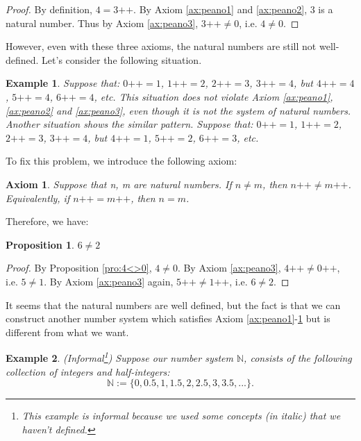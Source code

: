 \documentclass[a4paper]{book}
\newtheorem*{proof}{\textit{Proof.}}
\theoremstyle{break}
\newtheorem{axiom}{Axiom}[chapter]
\newtheorem{example}{Example}[section]
\newtheorem{proposition}{Proposition}[section]
\begin{document}
			\begin{proof}
				By definition, $4=3\texttt{++}$. By Axiom \ref{ax:peano1} and \ref{ax:peano2}, 3 is a natural number. Thus by Axiom \ref{ax:peano3}, $3\texttt{++} \neq 0$, i.e. $4 \neq 0$.
			\end{proof}
			However, even with these three axioms, the natural numbers are still not well-defined. Let's consider the following situation.
			\begin{example}
				Suppose that: $0\texttt{++}=1$, $1\texttt{++}=2$, $2\texttt{++}=3$, $3\texttt{++}=4$, but $4\texttt{++}=4$, $5\texttt{++}=4$, $6\texttt{++}=4$, etc. This situation does not violate Axiom \ref{ax:peano1}, \ref{ax:peano2} and \ref{ax:peano3}, even though it is not the system of natural numbers.\\
				Another situation shows the similar pattern. Suppose that: $0\texttt{++}=1$, $1\texttt{++}=2$, $2\texttt{++}=3$, $3\texttt{++}=4$, but $4\texttt{++}=1$, $5\texttt{++}=2$, $6\texttt{++}=3$, etc.
			\end{example}
			To fix this problem, we introduce the following axiom:
			\begin{axiom}
				\label{ax:peano4}
				Suppose that n, m are natural numbers. If $ n \neq m$, then $ n\texttt{++} \neq  m \texttt{++}$. Equivalently, if $ n\texttt{++} =  m \texttt{++}$, then $n = m$.
			\end{axiom}
			Therefore, we have:
			\begin{proposition}
				$6 \neq 2$
			\end{proposition}
			\begin{proof}
				By Proposition \ref{pro:4<>0}, $4 \neq 0$. By Axiom \ref{ax:peano3}, $4\texttt{++} \neq  0 \texttt{++}$, i.e. $5 \neq 1$. By Axiom \ref{ax:peano3} again, $5\texttt{++} \neq  1 \texttt{++}$, i.e. $6 \neq 2$.
			\end{proof}
			It seems that the natural numbers are well defined, but the fact is that we can construct another number system which satisfies Axiom \ref{ax:peano1}-\ref{ax:peano4} but is different from what we want.
			\begin{example}
				(Informal\footnote{This example is informal because we used some concepts (in italic) that we haven't defined.}) Suppose our number system $\mathbb{N}$, consists of the following collection of \textit{integers} and \textit{half-integers}:
				\begin{equation*}
					\mathbb{N} := \{0,0.5,1,1.5,2,2.5,3,3.5,...\}.
				\end{equation*}
      \end{example}
\end{document}
